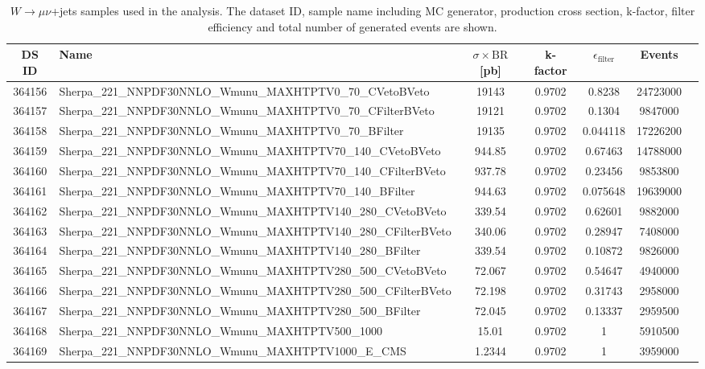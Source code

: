 \begin{landscape}
\begin{table}[!htb]
\caption[$W\to \mu\nu+$ jets Monte Carlo samples for background estimation]{$W \to \mu\nu$+jets samples used in the analysis. The dataset ID, sample name including MC generator, production cross section, k-factor, filter efficiency and total number of generated events are shown.}
\label{tabular:mc_samples_Wmunujets}
\begin{footnotesize}
\begin{center}
\begin{tabular}{c|l|c|c|c|cr}
	\hline\hline
	DS ID & Name & $\sigma\times\text{BR}$ [pb] & k-factor & $\epsilon_{\text{filter}}$ & Events \\ \hline\hline
364156 & Sherpa\_221\_NNPDF30NNLO\_Wmunu\_MAXHTPTV0\_70\_CVetoBVeto & 19143 & 0.9702 & 0.8238 & 24723000 \\
364157 & Sherpa\_221\_NNPDF30NNLO\_Wmunu\_MAXHTPTV0\_70\_CFilterBVeto & 19121 & 0.9702 & 0.1304 & 9847000 \\
364158 & Sherpa\_221\_NNPDF30NNLO\_Wmunu\_MAXHTPTV0\_70\_BFilter & 19135 & 0.9702 & 0.044118 & 17226200 \\
364159 & Sherpa\_221\_NNPDF30NNLO\_Wmunu\_MAXHTPTV70\_140\_CVetoBVeto & 944.85 & 0.9702 & 0.67463 & 14788000 \\
364160 & Sherpa\_221\_NNPDF30NNLO\_Wmunu\_MAXHTPTV70\_140\_CFilterBVeto & 937.78 & 0.9702 & 0.23456 & 9853800 \\
364161 & Sherpa\_221\_NNPDF30NNLO\_Wmunu\_MAXHTPTV70\_140\_BFilter & 944.63 & 0.9702 & 0.075648 & 19639000 \\
364162 & Sherpa\_221\_NNPDF30NNLO\_Wmunu\_MAXHTPTV140\_280\_CVetoBVeto & 339.54 & 0.9702 & 0.62601 & 9882000 \\
364163 & Sherpa\_221\_NNPDF30NNLO\_Wmunu\_MAXHTPTV140\_280\_CFilterBVeto & 340.06 & 0.9702 & 0.28947 & 7408000 \\
364164 & Sherpa\_221\_NNPDF30NNLO\_Wmunu\_MAXHTPTV140\_280\_BFilter & 339.54 & 0.9702 & 0.10872 & 9826000 \\
364165 & Sherpa\_221\_NNPDF30NNLO\_Wmunu\_MAXHTPTV280\_500\_CVetoBVeto & 72.067 & 0.9702 & 0.54647 & 4940000 \\
364166 & Sherpa\_221\_NNPDF30NNLO\_Wmunu\_MAXHTPTV280\_500\_CFilterBVeto & 72.198 & 0.9702 & 0.31743 & 2958000 \\
364167 & Sherpa\_221\_NNPDF30NNLO\_Wmunu\_MAXHTPTV280\_500\_BFilter & 72.045 & 0.9702 & 0.13337 & 2959500 \\
364168 & Sherpa\_221\_NNPDF30NNLO\_Wmunu\_MAXHTPTV500\_1000 & 15.01 & 0.9702 & 1 & 5910500 \\
364169 & Sherpa\_221\_NNPDF30NNLO\_Wmunu\_MAXHTPTV1000\_E\_CMS & 1.2344 & 0.9702 & 1 & 3959000 \\
	\hline\hline
\end{tabular}
\end{center}
\end{footnotesize}
\end{table}


\end{landscape}
